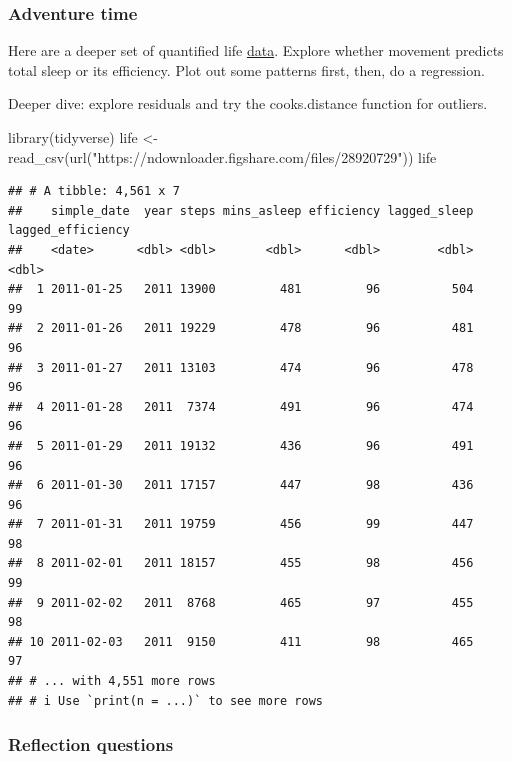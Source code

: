 \documentclass[
]{book}
\newenvironment{Shaded}{\begin{snugshade}}{\end{snugshade}}
\newcommand{\FunctionTok}[1]{\textcolor[rgb]{0.00,0.00,0.00}{#1}}
\newcommand{\NormalTok}[1]{#1}
\newcommand{\OtherTok}[1]{\textcolor[rgb]{0.56,0.35,0.01}{#1}}
\newcommand{\StringTok}[1]{\textcolor[rgb]{0.31,0.60,0.02}{#1}}
\begin{document}
\hypertarget{adventure-time-2}{%
\subsubsection*{Adventure time}\label{adventure-time-2}}

Here are a deeper set of quantified life \href{https://figshare.com/articles/dataset/Quantified_life/12803105}{data}. Explore whether movement predicts total sleep or its efficiency. Plot out some patterns first, then, do a regression.

Deeper dive: explore residuals and try the cooks.distance function for outliers.

\begin{Shaded}
\begin{Highlighting}[]
\FunctionTok{library}\NormalTok{(tidyverse)}
\NormalTok{life }\OtherTok{\textless{}{-}} \FunctionTok{read\_csv}\NormalTok{(}\FunctionTok{url}\NormalTok{(}\StringTok{"https://ndownloader.figshare.com/files/28920729"}\NormalTok{))}
\NormalTok{life}
\end{Highlighting}
\end{Shaded}

\begin{verbatim}
## # A tibble: 4,561 x 7
##    simple_date  year steps mins_asleep efficiency lagged_sleep lagged_efficiency
##    <date>      <dbl> <dbl>       <dbl>      <dbl>        <dbl>             <dbl>
##  1 2011-01-25   2011 13900         481         96          504                99
##  2 2011-01-26   2011 19229         478         96          481                96
##  3 2011-01-27   2011 13103         474         96          478                96
##  4 2011-01-28   2011  7374         491         96          474                96
##  5 2011-01-29   2011 19132         436         96          491                96
##  6 2011-01-30   2011 17157         447         98          436                96
##  7 2011-01-31   2011 19759         456         99          447                98
##  8 2011-02-01   2011 18157         455         98          456                99
##  9 2011-02-02   2011  8768         465         97          455                98
## 10 2011-02-03   2011  9150         411         98          465                97
## # ... with 4,551 more rows
## # i Use `print(n = ...)` to see more rows
\end{verbatim}

\hypertarget{reflection-questions-2}{%
\subsubsection*{Reflection questions}\label{reflection-questions-2}}
\end{document}
